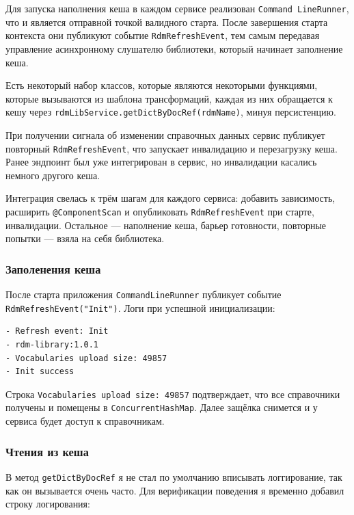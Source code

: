 Для запуска наполнения кеша в каждом сервисе реализован                      
\texttt{Command LineRunner}, что и является отправной точкой валидного старта.
После завершения старта контекста они публикуют событие                      
\texttt{RdmRefreshEvent}, тем самым передавая управление                     
асинхронному слушателю библиотеки, который начинает заполнение кеша.       
                                                                              
Есть некоторый набор классов, которые являются некоторыми функциями, 
которые вызываются из шаблона трансформаций,     
каждая из них обращается к кешу                   
через \texttt{rdmLibService.getDictByDocRef(rdmName)},                       
минуя персистенцию. 

При получении сигнала об изменении                       
справочных данных сервис публикует повторный \texttt{RdmRefreshEvent},       
что запускает инвалидацию и перезагрузку кеша. 
Ранее эндпоинт был уже интегрирован в сервис, но инвалидации касались немного другого кеша.                        
                                                                                                               
Интеграция свелась к трём шагам для каждого сервиса:          
добавить зависимость, расширить \texttt{@ComponentScan} и                    
опубликовать \texttt{RdmRefreshEvent} при старте, инвалидации.                            
Остальное --- наполнение кеша, барьер готовности, повторные попытки ---      
взяла на себя библиотека.

\subsubsection{Заполенения кеша}
После старта приложения \texttt{CommandLineRunner} публикует событие
\texttt{RdmRefreshEvent("Init")}.
Логи при успешной инициализации:

\begin{lstlisting}[language={}]
- Refresh event: Init
- rdm-library:1.0.1
- Vocabularies upload size: 49857
- Init success
\end{lstlisting}

Строка \texttt{Vocabularies upload size: 49857} подтверждает, что все
справочники получены и помещены в \texttt{ConcurrentHashMap}.
Далее защёлка снимется и у сервиса будет доступ к справочникам.

\subsubsection{Чтения из кеша}
В метод \texttt{getDictByDocRef} я не стал по умолчанию вписывать логгирование,
так как он вызывается очень часто. Для верификации поведения я временно добавил
строку логирования:

